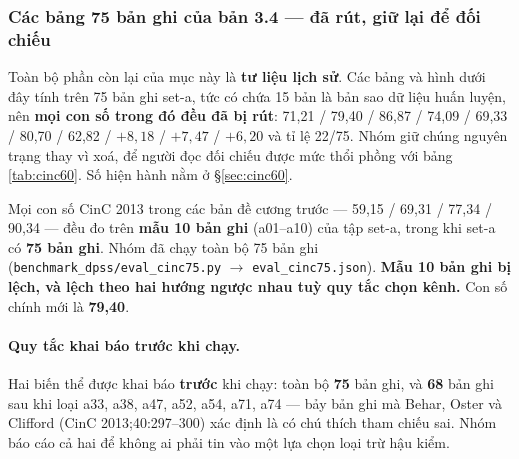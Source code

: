 

\subsubsection{Các bảng 75 bản ghi của bản 3.4 --- đã rút, giữ lại để đối chiếu}
\label{sec:cinc75_darut}

Toàn bộ phần còn lại của mục này là \textbf{tư liệu lịch sử}. Các bảng và hình dưới đây tính trên 75
bản ghi set-a, tức có chứa 15 bản là bản sao dữ liệu huấn luyện, nên \textbf{mọi con số trong đó đều
đã bị rút}: 71,21 / 79,40 / 86,87 / 74,09 / 69,33 / 80,70 / 62,82 / $+8{,}18$ / $+7{,}47$ / $+6{,}20$
và tỉ lệ 22/75. Nhóm giữ chúng nguyên trạng thay vì xoá, để người đọc đối chiếu được mức thổi phồng
với bảng \ref{tab:cinc60}. Số hiện hành nằm ở \S\ref{sec:cinc60}.

\begin{canhbao}[title={(Bản 3.4) Nhóm thay toàn bộ con số CinC 2013 của bản v3.2 --- các số 75 bản dưới đây đã rút ở bản 3.5}]
Mọi con số CinC 2013 trong các bản đề cương trước --- 59,15 / 69,31 / 77,34 / 90,34 --- đều đo trên
\textbf{mẫu 10 bản ghi} (a01--a10) của tập set-a, trong khi set-a có \textbf{75 bản ghi}. Nhóm đã chạy
toàn bộ 75 bản ghi (\texttt{benchmark\_dpss/eval\_cinc75.py} $\to$ \texttt{eval\_cinc75.json}).
\textbf{Mẫu 10 bản ghi bị lệch, và lệch theo hai hướng ngược nhau tuỳ quy tắc chọn kênh.} Con số chính
mới là \textbf{79,40}.
\end{canhbao}

\paragraph{Quy tắc khai báo trước khi chạy.} Hai biến thể được khai báo \textbf{trước} khi chạy:
toàn bộ \textbf{75} bản ghi, và \textbf{68} bản ghi sau khi loại a33, a38, a47, a52, a54, a71, a74 ---
bảy bản ghi mà Behar, Oster và Clifford (CinC 2013;40:297--300) xác định là có chú thích tham chiếu sai.
Nhóm báo cáo cả hai để không ai phải tin vào một lựa chọn loại trừ hậu kiểm.

